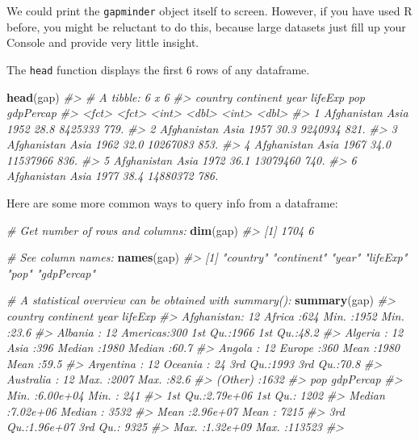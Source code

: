\documentclass[
]{book}
\newenvironment{Shaded}{\begin{snugshade}}{\end{snugshade}}
\newcommand{\CommentTok}[1]{\textcolor[rgb]{0.56,0.35,0.01}{\textit{#1}}}
\newcommand{\KeywordTok}[1]{\textcolor[rgb]{0.13,0.29,0.53}{\textbf{#1}}}
\newcommand{\NormalTok}[1]{#1}
\begin{document}
We could print the \texttt{gapminder} object itself to screen. However, if you have used R before, you might be reluctant to do this, because large datasets just fill up your Console and provide very little insight.

The \texttt{head} function displays the first 6 rows of any dataframe.

\begin{Shaded}
\begin{Highlighting}[]
\KeywordTok{head}\NormalTok{(gap)}
\CommentTok{#> # A tibble: 6 x 6}
\CommentTok{#>   country     continent  year lifeExp      pop gdpPercap}
\CommentTok{#>   <fct>       <fct>     <int>   <dbl>    <int>     <dbl>}
\CommentTok{#> 1 Afghanistan Asia       1952    28.8  8425333      779.}
\CommentTok{#> 2 Afghanistan Asia       1957    30.3  9240934      821.}
\CommentTok{#> 3 Afghanistan Asia       1962    32.0 10267083      853.}
\CommentTok{#> 4 Afghanistan Asia       1967    34.0 11537966      836.}
\CommentTok{#> 5 Afghanistan Asia       1972    36.1 13079460      740.}
\CommentTok{#> 6 Afghanistan Asia       1977    38.4 14880372      786.}
\end{Highlighting}
\end{Shaded}

Here are some more common ways to query info from a dataframe:

\begin{Shaded}
\begin{Highlighting}[]
\CommentTok{# Get number of rows and columns:}
\KeywordTok{dim}\NormalTok{(gap)}
\CommentTok{#> [1] 1704    6}

\CommentTok{# See column names:}
\KeywordTok{names}\NormalTok{(gap)}
\CommentTok{#> [1] "country"   "continent" "year"      "lifeExp"   "pop"       "gdpPercap"}

\CommentTok{# A statistical overview can be obtained with summary():}
\KeywordTok{summary}\NormalTok{(gap)}
\CommentTok{#>         country        continent        year         lifeExp    }
\CommentTok{#>  Afghanistan:  12   Africa  :624   Min.   :1952   Min.   :23.6  }
\CommentTok{#>  Albania    :  12   Americas:300   1st Qu.:1966   1st Qu.:48.2  }
\CommentTok{#>  Algeria    :  12   Asia    :396   Median :1980   Median :60.7  }
\CommentTok{#>  Angola     :  12   Europe  :360   Mean   :1980   Mean   :59.5  }
\CommentTok{#>  Argentina  :  12   Oceania : 24   3rd Qu.:1993   3rd Qu.:70.8  }
\CommentTok{#>  Australia  :  12                  Max.   :2007   Max.   :82.6  }
\CommentTok{#>  (Other)    :1632                                               }
\CommentTok{#>       pop             gdpPercap     }
\CommentTok{#>  Min.   :6.00e+04   Min.   :   241  }
\CommentTok{#>  1st Qu.:2.79e+06   1st Qu.:  1202  }
\CommentTok{#>  Median :7.02e+06   Median :  3532  }
\CommentTok{#>  Mean   :2.96e+07   Mean   :  7215  }
\CommentTok{#>  3rd Qu.:1.96e+07   3rd Qu.:  9325  }
\CommentTok{#>  Max.   :1.32e+09   Max.   :113523  }
\CommentTok{#> }
\end{Highlighting}
\end{Shaded}
\end{document}
